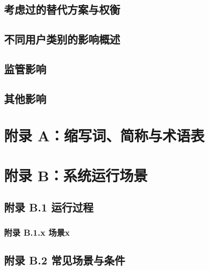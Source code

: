 \documentclass{ctexart}
\begin{document}
\subsection{考虑过的替代方案与权衡}

\subsection{不同用户类别的影响概述}

\subsection{监管影响}

\subsection{其他影响}

\newpage
\section{附录 A：缩写词、简称与术语表}

\newpage
\section{附录 B：系统运行场景}

\subsection{附录 B.1 运行过程}

\subsubsection{附录 B.1.x 场景x}

\subsection{附录 B.2 常见场景与条件}
\end{document}
